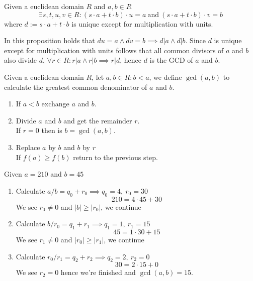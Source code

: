 \begin{proposition}\label{pro:factor_unique}
   Given a euclidean domain \(R\) and \(a, b \in R\)
   \[\exists s, t, u, v \in R: (s \cdot a + t \cdot b) \cdot u = a~\text{and}~(s \cdot a + t \cdot b) \cdot v = b\]
   where \(d := s \cdot a + t \cdot b\) is unique except for multiplication with units.
\end{proposition}
\begin{remark}
   In this proposition holds that \(du = a \land dv = b \implies d|a \land d|b\).
   Since \(d\) is unique except for multiplication with units follows that all common divisors of \(a\) and \(b\) also divide \(d\), \(\forall r \in R: r|a \land r|b \implies r|d\), hence \(d\) is the GCD of \(a\) and \(b\).
\end{remark}

\begin{definition}
   Given a euclidean domain \(R\), let \(a, b \in R: b < a\), we define \(\gcd(a, b)\) to calculate the greatest common denominator of \(a\) and \(b\).
   \begin{enumerate}
      \item If \(a < b\) exchange \(a\) and \(b\).
      \item Divide \(a\) and \(b\) and get the remainder \(r\).\\
         If \(r = 0\) then is \(b = \gcd(a, b)\).
      \item Replace \(a\) by \(b\) and \(b\) by \(r\)\\
         If \(f(a) \geq f(b)\) return to the previous step.
   \end{enumerate}
\end{definition}

\begin{example}
   Given \(a = 210\) and \(b = 45\)
   \begin{enumerate}
      \item Calculate \(a / b = q_0 + r_0 \implies q_0 = 4,~r_0 = 30\)
         \[210 = 4 \cdot 45 + 30\]
         We see \(r_0 \neq 0\) and \(|b| \geq |r_0|\), we continue
      \item Calculate \(b / r_0 = q_1 + r_1 \implies q_1 = 1,~r_1 = 15\)
         \[45 = 1 \cdot 30 + 15\]
         We see \(r_1 \neq 0\) and \(|r_0| \geq |r_1|\), we continue
      \item Calculate \(r_0 / r_1 = q_2 + r_2 \implies q_2 = 2,~r_2 = 0\)
         \[30 = 2 \cdot 15 + 0\]
         We see \(r_2 = 0\) hence we're finished and \(\gcd(a, b) = 15\).
   \end{enumerate}
\end{example}

